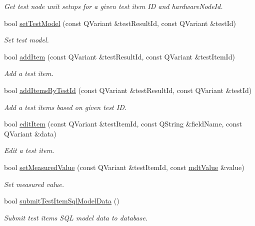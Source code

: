 \begin{DoxyCompactItemize}
\begin{DoxyCompactList}\small\item\em Get test node unit setups for a given test item I\-D and hardware\-Node\-Id. \end{DoxyCompactList}\item 
bool \hyperlink{classmdt_tt_test_a3ee695d1947da6472df7233dd66be907}{set\-Test\-Model} (const Q\-Variant \&test\-Result\-Id, const Q\-Variant \&test\-Id)
\begin{DoxyCompactList}\small\item\em Set test model. \end{DoxyCompactList}\item 
bool \hyperlink{classmdt_tt_test_a858c1a790c340bc00806c4ed75eda59a}{add\-Item} (const Q\-Variant \&test\-Result\-Id, const Q\-Variant \&test\-Item\-Id)
\begin{DoxyCompactList}\small\item\em Add a test item. \end{DoxyCompactList}\item 
bool \hyperlink{classmdt_tt_test_a7aa5fddc7b9ea6c113329d6e891d93d1}{add\-Items\-By\-Test\-Id} (const Q\-Variant \&test\-Result\-Id, const Q\-Variant \&test\-Id)
\begin{DoxyCompactList}\small\item\em Add a test items based on given test I\-D. \end{DoxyCompactList}\item 
bool \hyperlink{classmdt_tt_test_afa83957e4e3e0223186f87b0afdcf87d}{edit\-Item} (const Q\-Variant \&test\-Item\-Id, const Q\-String \&field\-Name, const Q\-Variant \&data)
\begin{DoxyCompactList}\small\item\em Edit a test item. \end{DoxyCompactList}\item 
bool \hyperlink{classmdt_tt_test_a1d3be1807a79d033bffb18a238ab32ba}{set\-Measured\-Value} (const Q\-Variant \&test\-Item\-Id, const \hyperlink{classmdt_value}{mdt\-Value} \&value)
\begin{DoxyCompactList}\small\item\em Set measured value. \end{DoxyCompactList}\item 
bool \hyperlink{classmdt_tt_test_a9bf7e4a4d1f43d31c0725b512f73f6d1}{submit\-Test\-Item\-Sql\-Model\-Data} ()
\begin{DoxyCompactList}\small\item\em Submit test items S\-Q\-L model data to database. \end{DoxyCompactList}\end{DoxyCompactItemize}
